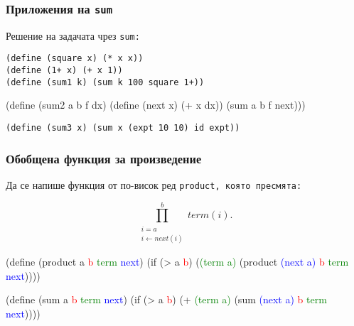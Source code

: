 \documentclass{beamer}
\begin{document}
\begin{frame}[fragile]
  \frametitle{Приложения на \tt{sum}}

  Решение на задачата чрез \tt{sum}:

  \pause
\begin{verbatim}
(define (square x) (* x x))
(define (1+ x) (+ x 1))
(define (sum1 k) (sum k 100 square 1+))
\end{verbatim}
\vspace{1em}

  \pause

\begin{semiverbatim}
(define (sum2 a b f dx)
  (define (next x) (+ x dx))
  (sum a b f next)))
\end{semiverbatim}
\vspace{1em}

  \pause\pause

\begin{verbatim}
(define (sum3 x) (sum x (expt 10 10) id expt))
\end{verbatim}
\end{frame}

\begin{frame}[fragile]
  \frametitle{Обобщена функция за произведение}
  Да се напише функция от по-висок ред \tt{product}, която пресмята:

  \begin{equation*}
    \prod_{\substack{i=a \\i \leftarrow next(i)}}^b term(i).
  \end{equation*}

\pause

\newcommand{\fb}{\only<4>\fbox}

\begin{semiverbatim}
(define (product a \textcolor{red}b \textcolor{green}{term} \textcolor{blue}{next})
  (if (> a \textcolor{red}b) \fb1 (\fb* \textcolor{green}{(term a)} (product \textcolor{blue}{(next a)} \textcolor{red}b \textcolor{green}{term} \textcolor{blue}{next}))))
\end{semiverbatim}

\pause

\begin{semiverbatim}
(define (sum a \textcolor{red}b \textcolor{green}{term} \textcolor{blue}{next})
  (if (> a \textcolor{red}b) \fb0 (\fb+ \textcolor{green}{(term a)} (sum \textcolor{blue}{(next a)} \textcolor{red}b \textcolor{green}{term} \textcolor{blue}{next}))))
\end{semiverbatim}

\end{frame}
\end{document}
